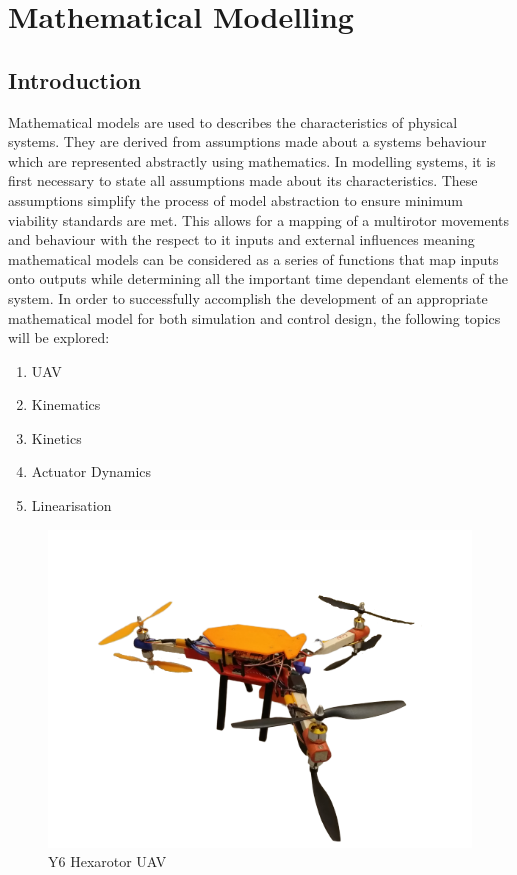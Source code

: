 \documentclass[12pt,a4paper,twoside]{report}
\begin{document}
		\newpage
			
	\chapter{Mathematical Modelling}
		
		\section{Introduction}
		
			Mathematical models are used to describes the characteristics of physical systems. They are derived from assumptions made about a systems behaviour which are represented abstractly using mathematics. In modelling systems, it is first necessary to state all assumptions made about its characteristics. These assumptions simplify the process of model abstraction to ensure minimum viability standards are met. This allows for a mapping of a multirotor movements and behaviour with the respect to it inputs and external influences meaning mathematical models can be considered as a series of functions that map inputs onto outputs while determining all the important time dependant elements of the system. In order to successfully accomplish the development of an appropriate mathematical model for both simulation and control design, the following topics will be explored:
			
			\begin{enumerate}
				\item
					UAV
				\item 
					Kinematics 
				\item 
					Kinetics
				\item 
					Actuator Dynamics
				\item 
					Linearisation
			\end{enumerate}
		
		\begin{figure}[h!]
			\centering
			\includegraphics[width=0.8\linewidth]{Y6UAV1-removebg-preview.png}
			\caption{Y6 Hexarotor UAV}
			\label{fig:Y6Hexarotor}
		\end{figure}
		\space
\end{document}
